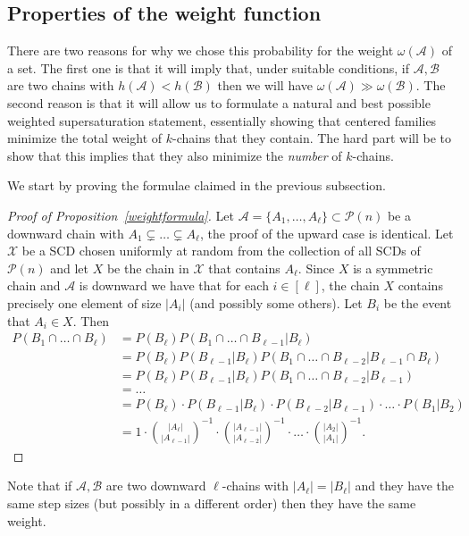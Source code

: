 \documentclass[12pt]{article}
\numberwithin{equation}{section}
\def\A{\mathcal{A}}
\def\B{\mathcal{B}}
\def\P{\mathcal{P}}
\def\X{\mathcal{X}}
\def\w{\omega}
\begin{document}
\subsection{Properties of the weight function}
There are two reasons for why we chose this probability for the weight $\w(\A)$ of a set. The first one is that it will imply that, under suitable conditions, if $\A,\B$ are two chains with $h(\A)<h(\B)$ then we will have $\w(\A)\gg \w(\B)$. The second reason is that it will allow us to formulate a natural and best possible weighted supersaturation statement, essentially showing that centered families minimize the total weight of $k$-chains that they contain. The hard part will be to show that this implies that they also minimize the \emph{number} of $k$-chains.

We start by proving the formulae claimed in the previous subsection.
\begin{proof}[Proof of Proposition~\ref{weightformula}]
Let $\A=\{A_1,\ldots,A_{\ell}\}\subset \P(n)$ be a downward chain with $A_1\subsetneq \ldots \subsetneq A_{\ell}$, the proof of the upward case is identical. Let $\X$ be a SCD chosen uniformly at random from the collection of all SCDs of  $\P(n)$ and let $X$ be the chain in $\X$ that contains $A_{\ell}$.  Since $X$ is a symmetric chain and $\A$ is downward we have that for each $i\in [\ell]$, the chain $X$ contains precisely one element of size $|A_i|$ (and possibly some others). Let $B_i$ be the event that $A_i\in X$. Then
\begin{equation*}
\begin{split}
P(B_1\cap \ldots \cap B_{\ell})&=P(B_{\ell})P(B_1\cap\ldots\cap B_{\ell -1}|B_{\ell})\\
&= P(B_{\ell})P(B_{\ell -1}|B_{\ell})P(B_1\cap\ldots\cap B_{\ell -2}|B_{\ell -1}\cap B_{\ell})\\
&=P(B_{\ell})P(B_{\ell -1}|B_{\ell})P(B_1\cap\ldots\cap B_{\ell -2}|B_{\ell -1})\\
&=\ldots\\
&=P(B_{\ell})\cdot P(B_{\ell -1}|B_{\ell})\cdot P(B_{\ell -2}|B_{\ell -1})\cdot \ldots \cdot P(B_1 | B_2)\\
&=1\cdot\binom{|A_{\ell}|}{|A_{\ell -1}|}^{-1}\cdot \binom{|A_{\ell -1}|}{|A_{\ell -2}|}^{-1}\cdot \ldots\cdot\binom{|A_2|}{|A_1|}^{-1}.
\end{split}
\end{equation*} 
\end{proof}
Note that if $\A,\B$ are two downward $\ell$-chains with $|A_{\ell}|=|B_{\ell}|$ and they have the same step sizes (but possibly in a different order) then they have the same weight.
\end{document}

